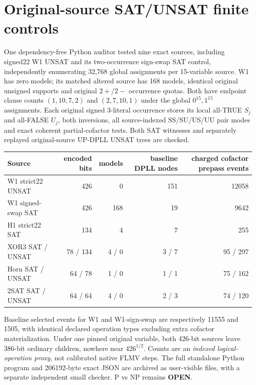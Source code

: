 \documentclass[10pt]{article}
\begin{document}
\section{Original-source SAT/UNSAT finite controls}
One dependency-free Python auditor tested nine exact sources, including signed22 W1 UNSAT and its two-occurrence sign-swap SAT control, independently enumerating 32,768 global assignments per 15-variable source. W1 has zero models; its matched altered source has 168 models, identical original unsigned supports and original $2+$/$2-$ occurrence quotas. Both have endpoint clause counts $(1,10,7,2)$ and $(2,7,10,1)$ under the global $0^{15},1^{15}$ assignments. Each original signed 3-literal occurrence stores its local all-TRUE $S_j$ and all-FALSE $U_j$, both inversions, all source-indexed SS/SU/US/UU pair modes and exact coherent partial-cofactor tests. Both SAT witnesses and separately replayed original-source UP-DPLL UNSAT trees are checked.
\begin{center}
\begin{tabular}{lrrrr}
\toprule
 Source & encoded bits & models & baseline DPLL nodes & charged cofactor prepass events\\\midrule
 W1 strict22 UNSAT&426&0&151&12058\\
 W1 signed-swap SAT&426&168&19&9642\\
 H1 strict22 SAT&134&4&7&255\\
 XOR3 SAT / UNSAT&78 / 134&4 / 0&3 / 7&95 / 297\\
 Horn SAT / UNSAT&64 / 78&1 / 0&1 / 1&75 / 162\\
 2SAT SAT / UNSAT&64 / 64&4 / 0&2 / 3&74 / 120\\\bottomrule
\end{tabular}
\end{center}
Baseline selected events for W1 and W1-sign-swap are respectively 11555 and 1505, with identical declared operation types excluding extra cofactor materialization. Under one pinned original variable, both 426-bit sources leave 386-bit ordinary children, nowhere near $426^{1/2}$. Counts are an \emph{indexed logical-operation proxy}, not calibrated native FLMV steps. The full standalone Python program and 206192-byte exact JSON are archived as user-visible files, with a separate independent small checker. P vs NP remains \textbf{OPEN}.
\end{document}
